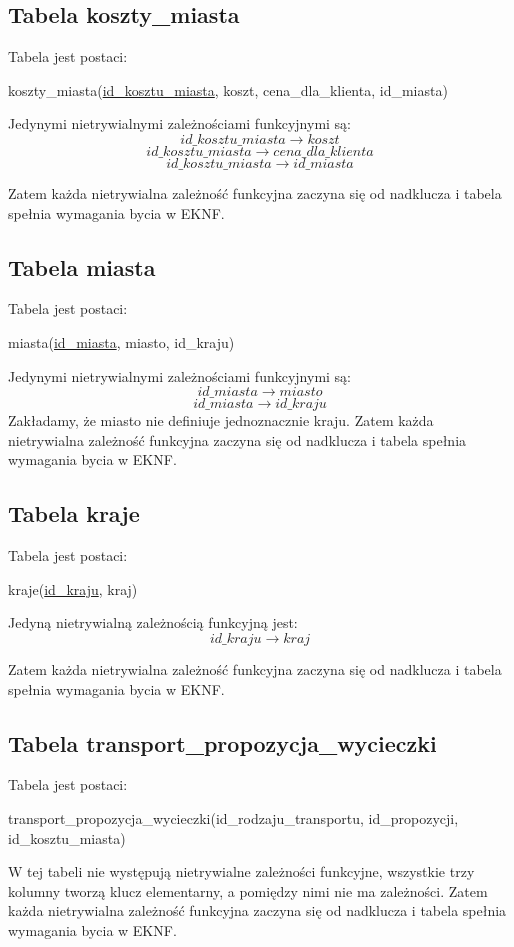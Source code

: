 \documentclass[a4paper,12pt]{mwart}
\begin{document}
\subsection{Tabela koszty\_miasta}
Tabela jest postaci:

koszty\_miasta(\underline{id\_kosztu\_miasta}, koszt, cena\_dla\_klienta, id\_miasta)

\noindent Jedynymi nietrywialnymi zależnościami funkcyjnymi są:
$$   id\_kosztu\_miasta  \rightarrow koszt $$
$$   id\_kosztu\_miasta  \rightarrow cena\_dla\_klienta $$
$$   id\_kosztu\_miasta  \rightarrow id\_miasta $$

Zatem każda nietrywialna zależność funkcyjna zaczyna się od nadklucza i tabela  spełnia wymagania bycia w EKNF.

\subsection{Tabela miasta}
Tabela jest postaci:

miasta(\underline{id\_miasta}, miasto, id\_kraju)

\noindent Jedynymi nietrywialnymi zależnościami funkcyjnymi są:
$$   id\_miasta  \rightarrow miasto $$
$$   id\_miasta  \rightarrow id\_kraju $$
Zakładamy, że miasto nie definiuje jednoznacznie kraju.
Zatem każda nietrywialna zależność funkcyjna zaczyna się od nadklucza i tabela  spełnia wymagania bycia w EKNF.

\subsection{Tabela kraje}
Tabela jest postaci:

kraje(\underline{id\_kraju}, kraj)

\noindent Jedyną nietrywialną zależnością funkcyjną jest:
$$   id\_kraju  \rightarrow kraj$$


Zatem każda nietrywialna zależność funkcyjna zaczyna się od nadklucza i tabela  spełnia wymagania bycia w EKNF.

\subsection{Tabela transport\_propozycja\_wycieczki}
Tabela jest postaci:

transport\_propozycja\_wycieczki(id\_rodzaju\_transportu, id\_propozycji, id\_kosztu\_miasta)

W tej tabeli nie występują nietrywialne zależności funkcyjne, wszystkie trzy kolumny tworzą klucz elementarny, a pomiędzy nimi nie ma zależności.
Zatem każda nietrywialna zależność funkcyjna zaczyna się od nadklucza i tabela  spełnia wymagania bycia w EKNF.
\end{document}
